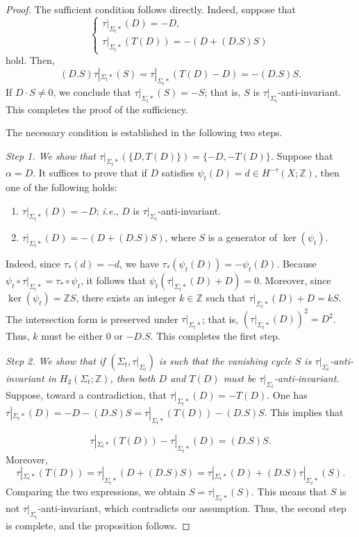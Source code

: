 \documentclass[11pt]{amsart}
\numberwithin{equation}{section}
\theoremstyle{definition}
\theoremstyle{plain}
\theoremstyle{remark}
\newcommand{\Z}{\mathbb{Z}}
\begin{document}
\begin{proof}
The sufficient condition follows directly. Indeed, suppose that
$$\begin{cases}
\tau|_{\Sigma_t*}(D)=-D,\\
\tau|_{\Sigma_t*}(T(D))=-(D+(D.S)S)
\end{cases}$$
hold. Then, $$(D.S)\tau|_{\Sigma_t*}(S)=\tau|_{\Sigma_t*}(T(D)-D)=-(D.S)S.$$
If $D \cdot S \neq 0$, we conclude that $\tau|_{\Sigma_t*}(S) = -S$; that is, $S$ is $\tau|_{\Sigma_t}$-anti-invariant. This completes the proof of the sufficiency.

The necessary condition is established in the following two steps.

\textit{Step 1. We show that $\tau|_{\Sigma_t*}(\{D,T(D)\})=\{-D,-T(D)\}$.}
Suppose that $\alpha=D$. It suffices to prove that if $D$ satisfies $\psi_t(D)=d\in H^{-\tau}(X;\Z)$, then one of the following holds:
\begin{enumerate}
    \item $\tau|_{\Sigma_t*}(D)=-D$; \textit{i.e.}, $D$ is $\tau|_{\Sigma_t}$-anti-invariant.
    \item $\tau|_{\Sigma_t*}(D)=-(D+(D.S)S)$, where $S$ is a generator of $\ker(\psi_t)$.
\end{enumerate}
Indeed, since $\tau_* (d)=-d$, we have $\tau_*(\psi_t(D))=-\psi_t (D)$. Because $\psi_t\circ\tau|_{\Sigma_t*}=\tau_*\circ \psi_t$, it follows that $\psi_t (\tau|_{\Sigma_t*}(D)+D)=0$. Moreover, since $\ker (\psi_t) =\Z S$, there exists an integer $k\in \Z$ such that $\tau|_{\Sigma_t*}(D)+D=kS$. The intersection form is preserved under $\tau|_{\Sigma_t*}$; that is, $(\tau|_{\Sigma_t*}(D))^2=D^2$. Thus, $k$ must be either $0$ or $-D.S$. This completes the first step.


\textit{Step 2. We show that if $(\Sigma_t,\tau|_{\Sigma_t})$ is  such that the vanishing cycle $S$ is $\tau|_{\Sigma_t}$-anti-invariant in $H_2(\Sigma_t; \Z)$, then both $D$ and $T(D)$ must be $\tau|_{\Sigma_t}$-anti-invariant. } Suppose, toward a contradiction, that $\tau|_{\Sigma_t*}(D)=-T(D)$. One has $\tau|_{\Sigma_t*}(D)=-D-(D.S)S=\tau|_{\Sigma_t*}(T(D))-(D.S)S$. This implies that 

$$\tau|_{\Sigma_t*}(T(D))-\tau|_{\Sigma_t*}(D)=(D.S)S.$$
Moreover, $$\tau|_{\Sigma_t*}(T(D))=\tau|_{\Sigma_t*}(D+(D.S)S)=\tau|_{\Sigma_t*}(D)+(D.S) \tau|_{\Sigma_t*}(S).$$
Comparing the two expressions, we obtain $S=\tau|_{\Sigma_t*}(S)$. This means that $S$ is not $\tau|_{\Sigma_t}$-anti-invariant, which contradicts our assumption. Thus, the second step is complete, and the proposition follows.
\end{proof}
\end{document}
